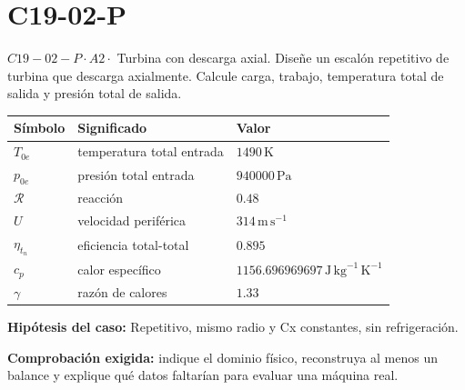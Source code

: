 \documentclass[10pt,openany]{book}
\begin{document}
\section{C19-02-P}
\(C19-02-P \cdot A2 \cdot\) Turbina con descarga axial. Diseñe un escalón repetitivo de turbina que descarga axialmente. Calcule carga, trabajo, temperatura total de salida y presión total de salida.
\begin{center}\begin{tabular}{p{.15\linewidth}p{.42\linewidth}p{.31\linewidth}}\textbf{Símbolo} & \textbf{Significado} & \textbf{Valor}\\\hline
\(T_{0e}\) & temperatura total entrada & \(1490\,\mathrm{K}\)\\
\(p_{0e}\) & presión total entrada & \(940000\,\mathrm{Pa}\)\\
\(\mathcal R\) & reacción & \(0.48\)\\
\(U\) & velocidad periférica & \(314\,\mathrm{m}\,\mathrm{s}^{-1}\)\\
\(\eta_{t_n}\) & eficiencia total-total & \(0.895\)\\
\(c_p\) & calor específico & \(1156.696969697\,\mathrm{J}\,\mathrm{kg}^{-1}\,\mathrm{K}^{-1}\)\\
\(\gamma\) & razón de calores & \(1.33\)\\
\end{tabular}\end{center}
\noindent\textbf{Hipótesis del caso:} Repetitivo, mismo radio y Cx constantes, sin refrigeración.\par
\noindent\textbf{Comprobación exigida:} indique el dominio físico, reconstruya al menos un balance y explique qué datos faltarían para evaluar una máquina real.\par
\begin{center}\end{center}
\clearpage
\end{document}
